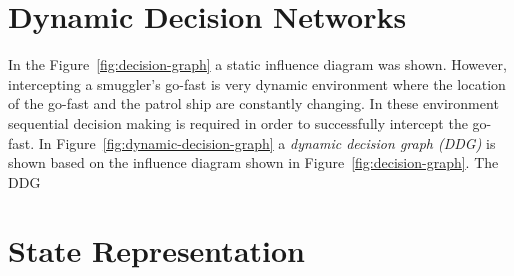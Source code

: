 \documentclass[conference]{IEEEtran}
\begin{document}
\section{Dynamic Decision Networks}





In the Figure~\ref{fig:decision-graph} a static influence diagram was shown. However, intercepting a smuggler's go-fast is very dynamic environment where the location of the go-fast and the patrol ship are constantly changing. In these environment sequential decision making is required in order to successfully intercept the go-fast. In Figure~\ref{fig:dynamic-decision-graph} a {\em dynamic decision graph (DDG)} is shown based on the influence diagram shown in Figure~\ref{fig:decision-graph}. The DDG



\section{State Representation}




\end{document}
